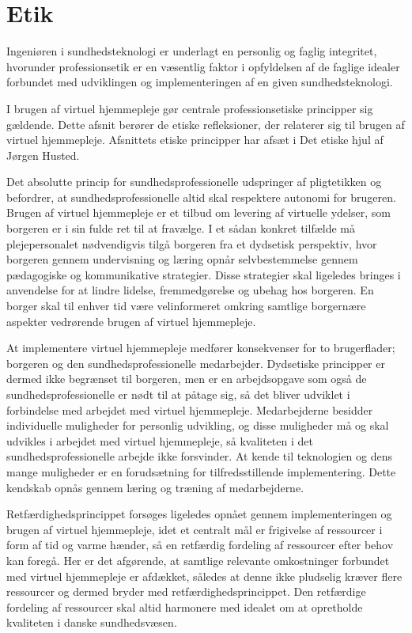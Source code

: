 \chapter{Etik}
Ingeniøren i sundhedsteknologi er underlagt en personlig og faglig integritet, hvorunder professionsetik er en væsentlig faktor i opfyldelsen af de faglige idealer forbundet med udviklingen og implementeringen af en given sundhedsteknologi.  

I brugen af virtuel hjemmepleje gør centrale professionsetiske principper sig gældende. Dette afsnit berører de etiske refleksioner, der relaterer sig til brugen af virtuel hjemmepleje. Afsnittets etiske principper har afsæt i Det etiske hjul af Jørgen Husted\cite{etiskhjul}. 

Det absolutte princip for sundhedsprofessionelle udspringer af pligtetikken og befordrer, at sundhedsprofessionelle altid skal respektere autonomi for brugeren\cite{mtv}. Brugen af virtuel hjemmepleje er et tilbud om levering af virtuelle ydelser, som borgeren er i sin fulde ret til at fravælge. I et sådan konkret tilfælde må plejepersonalet nødvendigvis tilgå borgeren fra et dydsetisk perspektiv, hvor borgeren gennem undervisning og læring opnår selvbestemmelse gennem pædagogiske og kommunikative strategier. Disse strategier skal ligeledes bringes i anvendelse for at lindre lidelse, fremmedgørelse og ubehag hos borgeren. En borger skal til enhver tid være velinformeret omkring samtlige borgernære aspekter vedrørende brugen af virtuel hjemmepleje. 

At implementere virtuel hjemmepleje medfører konsekvenser for to brugerflader; borgeren og den sundhedsprofessionelle medarbejder. Dydsetiske principper er dermed ikke begrænset til borgeren, men er en arbejdsopgave som også de sundhedsprofessionelle er nødt til at påtage sig, så det bliver udviklet i forbindelse med arbejdet med virtuel hjemmepleje. Medarbejderne besidder individuelle muligheder for personlig udvikling, og disse muligheder må og skal udvikles i arbejdet med virtuel hjemmepleje, så kvaliteten i det sundhedsprofessionelle arbejde ikke forsvinder. At kende til teknologien og dens mange muligheder er en forudsætning for tilfredsstillende implementering. Dette kendskab opnås gennem læring og træning af medarbejderne\cite{mtv}. 

Retfærdighedsprincippet forsøges ligeledes opnået gennem implementeringen og brugen af virtuel hjemmepleje, idet et centralt mål er frigivelse af ressourcer i form af tid og varme hænder, så en retfærdig fordeling af ressourcer efter behov kan foregå. Her er det afgørende, at samtlige relevante omkostninger forbundet med virtuel hjemmepleje er afdækket, således at denne ikke pludselig kræver flere ressourcer og dermed bryder med retfærdighedsprincippet. Den retfærdige fordeling af ressourcer skal altid harmonere med idealet om at opretholde kvaliteten i danske sundhedsvæsen\cite{mtv}.


